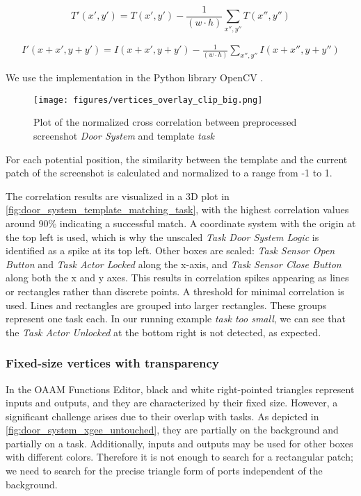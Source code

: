 \begin{equation*}
    T'(x', y') = T(x', y') - \frac{1}{(w \cdot h)} \sum_{x'', y''} T(x'', y'')
\end{equation*}

\begin{multline*}
    I'(x + x', y + y')  = I(x + x', y + y') - \frac{1}{(w \cdot h)} \sum_{x'', y''} I(x + x'', y + y'')
\end{multline*}


We use the implementation in the Python library OpenCV \cite{Bradski2000}.

\begin{figure}[htb]
  \centering
  \texttt{[image: figures/vertices\_overlay\_clip\_big.png]}
  \caption{Plot of the normalized cross correlation between preprocessed screenshot \emph{Door System} and template \emph{task}}
  
  \label{fig:door_system_template_matching_task}
\end{figure}

For each potential position, the similarity between the template and the current patch of the screenshot is calculated and normalized to a range from -1 to 1.

The correlation results are visualized in a 3D plot in \autoref{fig:door_system_template_matching_task}, with the highest correlation values around 90\% indicating a successful match. A coordinate system with the origin at the top left is used, which is why the unscaled \emph{Task Door System Logic} is identified as a spike at its top left. Other boxes are scaled: \emph{Task Sensor Open Button} and \emph{Task Actor Locked} along the x-axis, and \emph{Task Sensor Close Button} along both the x and y axes. This results in correlation spikes appearing as lines or rectangles rather than discrete points.
A threshold for minimal correlation is used. Lines and rectangles are grouped into larger rectangles. These groups represent one task each. In our running example \emph{task too small}, we can see that the \emph{Task Actor Unlocked} at the bottom right is not detected, as expected.

\subsubsection{Fixed-size vertices with transparency}
In the OAAM Functions Editor, black and white right-pointed triangles represent inputs and outputs, and they are characterized by their fixed size. However, a significant challenge arises due to their overlap with tasks. As depicted in \autoref{fig:door_system_xgee_untouched}, they are partially on the background and partially on a task. Additionally, inputs and outputs may be used for other boxes with different colors. Therefore it is not enough to search for a rectangular patch; we need to search for the precise triangle form of ports independent of the background. 

